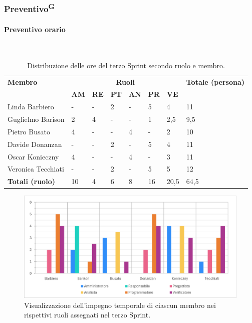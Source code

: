 \documentclass[8pt]{article}
\newcommand{\glossterm}[1]{#1\textsuperscript{G}} %
\newcommand{\subsubsubsection}[1]{\paragraph{#1}\mbox{}\\}
\begin{document}
\subsubsection{\glossterm{Preventivo}}
\subsubsubsection{Preventivo orario}
\begin{table}[ht!]
    \centering
    \begin{tabular}{p{4cm} p{1cm} p{1cm} p{1cm} p{1cm} p{1cm} p{1cm} p{3cm}}
        \toprule
        \textbf{Membro} & \multicolumn{6}{c}{\textbf{Ruoli}} & \textbf{Totale (persona)}\\
		& \textbf{AM} & \textbf{RE} & \textbf{PT} & \textbf{AN} & \textbf{PR} & \textbf{VE}\\
		\midrule
        Linda Barbiero       & -   & -   & 2   & -   & 5   & 4   & 11 \\
        Guglielmo Barison    & 2   & 4   & -   & -   & 1   & 2,5 & 9,5 \\
        Pietro Busato        & 4   & -   & -   & 4   & -   & 2   & 10 \\
        Davide Donanzan      & -   & -   & 2   & -   & 5   & 4   & 11 \\
        Oscar Konieczny      & 4   & -   & -   & 4   & -   & 3   & 11 \\
        Veronica Tecchiati   & -   & -   & 2   & -   & 5   & 5   & 12 \\
        \bottomrule
        \textbf{Totali (ruolo)} & 10 & 4 & 6 & 8 & 16 & 20,5 & 64,5 \\
    \end{tabular}
    \caption{Distribuzione delle ore del terzo Sprint secondo ruolo e membro.}
    \label{table:Distribuzione delle ore del terzo Sprint secondo ruolo e membro}
\end{table}
\begin{figure}[ht!]
    \centering
    \includegraphics[width=15cm]{./images_pdp/istogramma_periodo_3.png}
    \caption{Visualizzazione dell’impegno temporale di ciascun membro nei rispettivi ruoli assegnati
    nel terzo Sprint.}
    \label{figure:Visualizzazione dell’impegno temporale di ciascun membro nei rispettivi ruoli
    assegnati nel terzo Sprint}
\end{figure}
\end{document}
